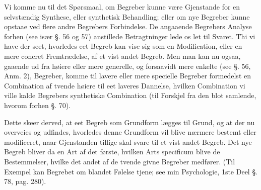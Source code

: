 \documentclass[12pt]{book}
\def\textit#1{#1}%
\def\emph#1{#1}%
\newcommand{\opage}[1]{\marginnote{\footnotesize\textit{[#1]}}}
\begin{document}
Vi komme nu til det Spørsmaal, om Begreber kunne være Gjenstande for en selvstændig
Synthese, eller synthetisk Behandling; eller om nye Begreber kunne opstaae ved flere
andre Begrebers Forbindelse. De angaaende Begrebers Analyse forhen (see især §. 56 og
57) anstillede Betragtninger lede os let til Svaret. Thi vi have der seet, hvorledes eet
Begreb kan vise sig som en Modification, eller en mere concret Fremtrædelse, af et vist
andet Begreb. Men man kan nu ogsaa, gaaende ud fra høiere eller mere generelle, og
forsaavidt mere enkelte (see §. 56, Anm. 2), Begreber, komme til lavere eller mere
specielle Begreber formedelst en Combination af tvende høiere til eet laveres Dannelse,
hvilken Combination vi ville kalde \emph{Begrebers synthetiske Combination} (til
Forskjel fra den blot samlende, hvorom forhen §. 70).

\opage{227} Dette skeer derved, at eet Begreb som Grundform lægges til Grund, og at der nu overveies
og udfindes, hvorledes denne Grundform vil blive nærmere bestemt eller modificeret, naar
Gjenstanden tillige skal svare til et vist andet Begreb. Det nye Begreb bliver da en Art
af det første, hvilken Arts \textit{specificum} blive de Bestemmelser, hvilke det andet
af de tvende givne Begreber medfører. (Til Exempel kan Begrebet om blandet Følelse
tjene; see min Psychologie, 1ste Deel §. 78, pag. 280).
\end{document}
